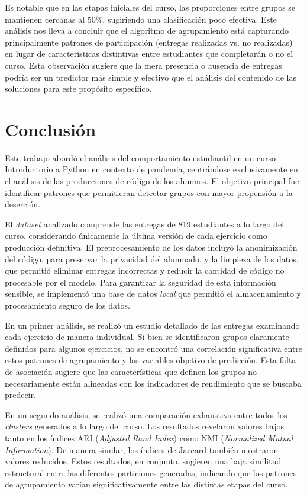 \documentclass[11pt,a4paper,twoside,openany]{tesis}
\begin{document}
Es notable que en las etapas iniciales del curso, las proporciones entre grupos se mantienen cercanas al 50\%, sugiriendo una clasificación poco efectiva. Este análisis nos lleva a concluir que el algoritmo de agrupamiento está capturando principalmente patrones de participación (entregas realizadas vs. no realizadas) en lugar de características distintivas entre estudiantes que completarán o no el curso. Esta observación sugiere que la mera presencia o ausencia de entregas podría ser un predictor más simple y efectivo que el análisis del contenido de las soluciones para este propósito específico.

\chapter{Conclusión}

Este trabajo abordó el análisis del comportamiento estudiantil en un curso Introductorio a Python en contexto de pandemia, centrándose exclusivamente en el análisis de las producciones de código de los alumnos. El objetivo principal fue identificar patrones que permitieran detectar grupos con mayor propensión a la deserción.

El \emph{dataset} analizado comprende las entregas de 819 estudiantes a lo largo del curso, considerando únicamente la última versión de cada ejercicio como producción definitiva. El preprocesamiento de los datos incluyó la anonimización del código, para preservar la privacidad del alumnado, y la limpieza de los datos, que permitió eliminar entregas incorrectas y reducir la cantidad de código no procesable por el modelo. Para garantizar la seguridad de esta información sensible, se implementó una base de datos \emph{local} que permitió el almacenamiento y procesamiento seguro de los datos.

En un primer análisis, se realizó un estudio detallado de las entregas examinando cada ejercicio de manera individual. Si bien se identificaron grupos claramente definidos para algunos ejercicios, no se encontró una correlación significativa entre estos patrones de agrupamiento y las variables objetivo de predicción. Esta falta de asociación sugiere que las características que definen los grupos no necesariamente están alineadas con los indicadores de rendimiento que se buscaba predecir.

En un segundo análisis, se realizó una comparación exhaustiva entre todos los \emph{clusters} generados a lo largo del curso. Los resultados revelaron valores bajos tanto en los índices ARI (\emph{Adjusted Rand Index}) como NMI (\emph{Normalized Mutual Information}). De manera similar, los índices de Jaccard también mostraron valores reducidos. Estos resultados, en conjunto, sugieren una baja similitud estructural entre las diferentes particiones generadas, indicando que los patrones de agrupamiento varían significativamente entre las distintas etapas del curso.
\end{document}
